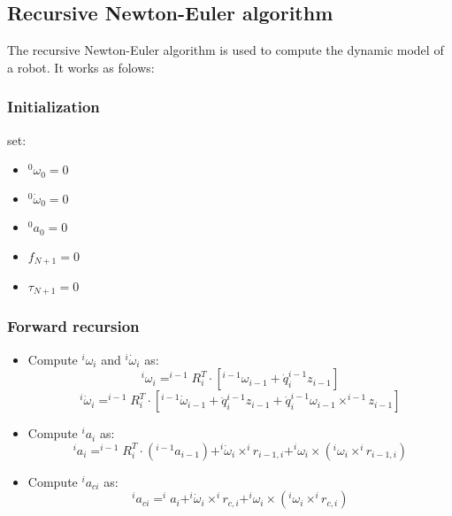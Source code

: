 \documentclass[a4paper,12pt]{article}
\begin{document}
\subsection{Recursive Newton-Euler algorithm}
The recursive Newton-Euler algorithm is used to compute the 
dynamic model of a robot. It works as folows:
\subsubsection{Initialization}
set:
\begin{itemize}
    \item $^0\omega_0 = 0$
    \item $^0\dot{\omega}_0=0$
    \item $^0a_0 = 0$
    \item $f_{N+1} = 0$
    \item $\tau_{N+1} = 0$
\end{itemize}
\subsubsection{Forward recursion}
\begin{itemize}
    \item Compute $^i\omega_i$ and $^i\dot{\omega}_i$ as: \begin{equation}
        ^i\omega_i = ^{i-1}R_i^T \cdot[ ^{i-1}\omega_{i-1} + \dot{q}_i ^{i-1}z_{i-1}]
    \end{equation} \begin{equation}
        ^i\dot{\omega}_i = ^{i-1}R_i^T \cdot[ ^{i-1}\dot{\omega}_{i-1} + \ddot{q}_i ^{i-1}z_{i-1}  + \dot{q}_i ^{i-1}\omega_{i-1} \times ^{i-1}z_{i-1}]
    \end{equation}
    \item Compute $^i a_i$ as: \begin{equation}
        ^i a_i = ^{i-1}R_i^T \cdot (^{i-1}a_{i-1}) + ^{i}\dot{\omega}_{i} \times ^{i}r_{i-1,i} + ^{i}\omega_{i} \times (^{i}\omega_{i} \times ^{i}r_{i-1,i})
    \end{equation}
    \item Compute $^i a_{ci}$ as: \begin{equation}
        ^i a_{ci} = ^i a_i + ^i\dot{\omega}_i \times ^i r_{c,i} + ^i\omega_i \times (^i\omega_i \times ^i r_{c,i})
    \end{equation}
\end{itemize}
\end{document}
